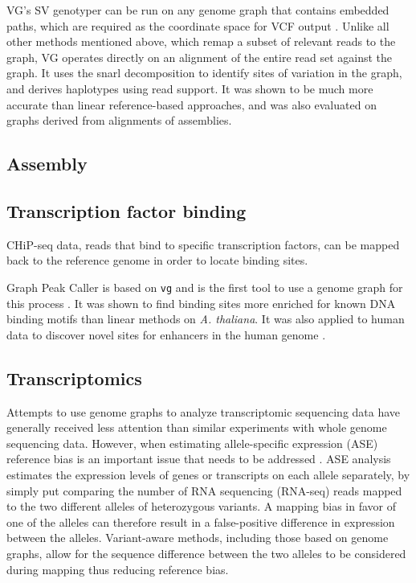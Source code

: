 VG's SV genotyper can be run on any genome graph that contains embedded paths, which are required as the coordinate space for VCF output \cite{hickey2019genotyping}.
Unlike all other methods mentioned above, which remap a subset of relevant reads to the graph, VG operates directly on an alignment of the entire read set against the graph.
It uses the snarl decomposition \cite{paten2018superbubbles} to identify sites of variation in the graph, and derives haplotypes using read support.
It was shown to be much more accurate than linear reference-based approaches, and was also evaluated on graphs derived from alignments of assemblies.

\subsection{Assembly}

\subsection{Transcription factor binding}

CHiP-seq data, reads that bind to specific transcription factors, can be mapped back to the reference genome in order to locate binding sites.
 
Graph Peak Caller is based on \texttt{vg} and is the first tool to use a genome graph for this process \cite{Grytten_2019}.
It was shown to find binding sites more enriched for known DNA binding motifs than linear methods on \emph{A.
thaliana}.
It was also applied to human data to discover novel sites for enhancers in the human genome \cite{groza2019personalized}. 


\subsection{Transcriptomics}

Attempts to use genome graphs to analyze transcriptomic sequencing data have generally received less attention than similar experiments with whole genome sequencing data.
However, when estimating allele-specific expression (ASE) reference bias is an important issue that needs to be addressed \cite{Degner2009-vw,Castel2015-ef}.
ASE analysis estimates the expression levels of genes or transcripts on each allele separately, by simply put comparing the number of RNA sequencing (RNA-seq) reads mapped to the two different alleles of heterozygous variants.
A mapping bias in favor of one of the alleles can therefore result in a false-positive difference in expression between the alleles.
Variant-aware methods, including those based on genome graphs, allow for the sequence difference between the two alleles to be considered during mapping thus reducing reference bias.

